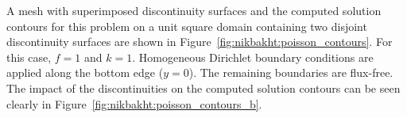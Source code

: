 A mesh with superimposed discontinuity surfaces and the computed
solution contours for this problem on a unit square domain
containing two disjoint discontinuity surfaces are shown in
Figure~\ref{fig:nikbakht:poisson_contours}.  For this case, $f = 1$
and $k = 1$.  Homogeneous Dirichlet boundary conditions are applied
along the bottom edge ($y = 0$). The remaining boundaries are flux-free.
The impact of the discontinuities on the computed solution contours can
be seen clearly in Figure~\ref{fig:nikbakht:poisson_contours_b}.
%
\begin{figure}
\bwfig
{}
\end{figure}
